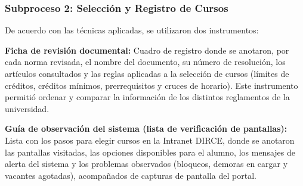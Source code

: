 \subsubsection{Subproceso 2: Selección y Registro de Cursos}

De acuerdo con las técnicas aplicadas, se utilizaron dos instrumentos:

\textbf{Ficha de revisión documental:} Cuadro de registro donde se anotaron, por cada norma revisada, el nombre del documento, su número de resolución, los artículos consultados y las reglas aplicadas a la selección de cursos (límites de créditos, créditos mínimos, prerrequisitos y cruces de horario). Este instrumento permitió ordenar y comparar la información de los distintos reglamentos de la universidad.

\textbf{Guía de observación del sistema (lista de verificación de pantallas):} Lista con los pasos para elegir cursos en la Intranet DIRCE, donde se anotaron las pantallas visitadas, las opciones disponibles para el alumno, los mensajes de alerta del sistema y los problemas observados (bloqueos, demoras en cargar y vacantes agotadas), acompañados de capturas de pantalla del portal.
